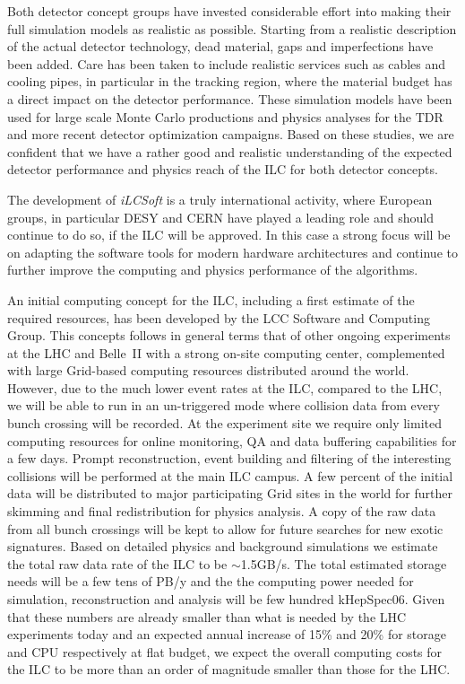 \documentclass[%
 reprint,
 amsmath,amssymb,
 aps,
]{revtex4-1}
\begin{document}
Both detector concept groups have invested considerable effort into making their full simulation models as realistic as possible.
Starting from a realistic description of the actual detector technology, dead material, gaps and imperfections have been added.
Care has been taken to include realistic services such as cables and cooling pipes, in particular in the tracking region, where
the material budget has a direct impact on the detector performance.
These simulation models have been used for large scale Monte Carlo productions and physics analyses for the TDR and more recent detector optimization
campaigns. Based on these studies, we are confident that we have a rather good and realistic understanding of the expected detector performance and physics
reach of the ILC for both detector concepts.

The development of \emph{iLCSoft} is a truly international activity, where European groups, in particular DESY and
CERN have played a leading role and should continue to do so, if the ILC will be approved. In this case
a strong focus will be on adapting the software tools for modern hardware architectures and continue to
further improve the computing and physics performance of the algorithms.


An initial computing concept for the ILC, including a first estimate of the required resources, has been developed by the LCC Software and Computing Group.
This concepts follows in general terms that of other ongoing experiments at the LHC and Belle~II with a strong on-site computing center, complemented with large
Grid-based computing resources distributed around the world. However, due to the much lower event rates at the ILC, compared to the LHC, we will be
able to run in an un-triggered mode where collision data from every bunch crossing will be recorded. At the experiment site we require only limited computing
resources for online monitoring, QA and data buffering capabilities for a few days. Prompt reconstruction, event building and filtering of the interesting collisions
will be performed at the main ILC campus.
A few percent of the initial data will be distributed to major participating Grid sites
in the world for further skimming and final redistribution for physics analysis. A copy of the raw data from all bunch crossings will be kept to allow for future searches for new exotic signatures. 
Based on detailed physics and background simulations we estimate the total raw data rate of the ILC to be $\sim$1.5GB/s.
The total estimated storage needs will be a few tens of PB/y and
the the computing power needed for simulation, reconstruction and analysis will be few hundred kHepSpec06.
Given that these numbers are already smaller than what is needed by the LHC experiments today and an expected annual increase of 15\% and 20\% for storage and CPU
respectively at flat budget, we expect the overall computing costs for the ILC to be more than an order of magnitude smaller than those for the LHC.
\end{document}
